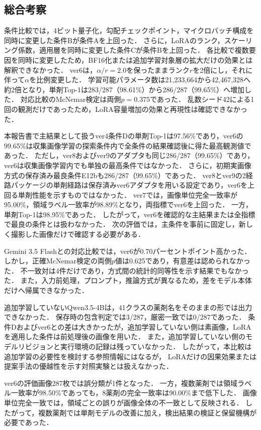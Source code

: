 \documentclass[uplatex,dvipdfmx]{jsarticle}
\begin{document}
\subsection{総合考察}

条件比較では，4ビット量子化，勾配チェックポイント，マイクロバッチ構成を同時に変更した条件Bが条件Aを上回った．
さらに，LoRAのランク，スケーリング係数，適用層を同時に変更した条件Cが条件Bを上回った．
各比較で複数要因を同時に変更したため，BF16化または追加学習対象層の拡大だけの効果とは解釈できなかった．
ver6は，$\alpha/r=2.0$を保ったままランク$r$を2倍にし，それに伴って$\alpha$を比例変更した．
学習可能パラメータ数は21,233,664から42,467,328へ約2倍となり，単剤Top-1は283/287（98.61\%）から286/287（99.65\%）へ増加した．
対応比較のMcNemar検定は両側$p=0.375$であった．
乱数シード42による1回の観測だけであったため，LoRA容量増加の効果と再現性は確認できなかった．

本報告書で主結果として扱うver4条件Dの単剤Top-1は97.56\%であり，ver6の99.65\%は収集画像学習の探索条件内で全条件の結果確認後に得た最高観測値であった．
ただし，ver8およびver9のアダプタも同じ286/287（99.65\%）であり，ver6は収集画像学習内でも単独の最高条件ではなかった．
さらに，初期実画像方式の保存済み最良条件E12bも286/287（99.65\%）であった．
ver8とver9の2経路パッケージの単剤経路は保存済みver6アダプタを用いる設定であり，ver6を上回る単剤性能を示すものではなかった．
ver7では，画像単位完全一致率が95.00\%，領域ラベル一致率が98.89\%となり，両指標でver6を上回った．
一方，単剤Top-1は98.95\%であった．
したがって，ver6を確認的な主結果または全指標で最良の条件とは扱わなかった．
次の評価では，主条件を事前に固定し，新しく撮影した画像だけで確認する必要がある．

Gemini 3.5 Flashとの対応比較では，ver6が0.70パーセントポイント高かった．
しかし，正確McNemar検定の両側$p$値は0.625であり，有意差は認められなかった．
不一致対は4件だけであり，方式間の統計的同等性を示す結果でもなかった．
また，入力前処理，プロンプト，推論方式が異なるため，差をモデル本体だけへ帰属できなかった．

追加学習していないQwen3.5-4Bは，41クラスの薬剤名をそのままの形では出力できなかった．
保存時の包含判定では3/287，厳密一致では0/287であった．
条件Dおよびver6との差は大きかったが，追加学習していない側は素画像，LoRAを適用した条件は前処理後の画像を用いた．
また，追加学習していない側のモデルリビジョンと実行環境の記録は残っていなかった．
したがって，本比較は追加学習の必要性を検討する参照情報にはなるが，
LoRAだけの因果効果または提案手法の優越性を示す対照実験とは扱えなかった．

ver6の評価画像287枚では誤分類が1件となった．
一方，複数薬剤では領域ラベル一致率が98.50\%であっても，8薬剤の完全一致率は90.00\%まで低下した．
画像単位完全一致では，領域ごとの誤りが画像全体の不一致として反映される．
したがって，複数薬剤では単剤モデルの改善に加え，検出結果の検証と保留機構が必要であった．
\end{document}
